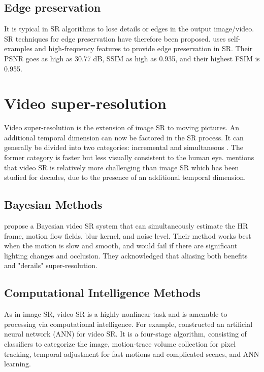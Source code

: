 \subsection{Edge preservation}
It is typical in SR algorithms to lose details or edges in the output image/video. 
SR techniques for edge preservation have therefore been proposed. 
\cite{Vishnukumar2014} uses self-examples and high-frequency features to provide edge preservation in SR. Their PSNR goes as high as 30.77 dB, SSIM as high as 0.935, and their highest FSIM is 0.955.

\section{Video super-resolution}

Video super-resolution is the extension of image SR to moving pictures.
An additional temporal dimension can now be factored in the SR process.
It can generally be divided into two categories: incremental and simultaneous \citep{Su2011}.
The former category is faster but less visually consistent to the human eye.
\cite{Liu2014} mentions that video SR is relatively more challenging than image SR which has been studied for decades, due to the presence of an additional temporal dimension.


\subsection{Bayesian Methods}

\cite{Liu2014} propose a Bayesian video SR system that can simultaneously estimate the HR frame, motion flow fields, blur kernel, and noise level.
Their method works best when the motion is slow and smooth, and would fail if there are significant lighting changes and occlusion.
They acknowledged that aliasing both benefits and "derails" super-resolution.


\subsection{Computational Intelligence Methods}
As in image SR, video SR is a highly nonlinear task and is amenable to processing via computational intelligence. 
For example, \cite{Cheng2013} constructed an artificial neural network (ANN) for video SR.
It is a four-stage algorithm, consisting of classifiers to categorize the image, motion-trace volume collection for pixel tracking, temporal adjustment for fast motions and complicated scenes, and ANN learning.



